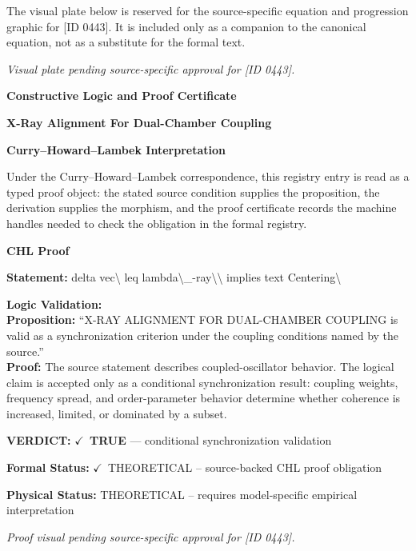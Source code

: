 \begingroup\footnotesize\sloppy
The visual plate below is reserved for the source-specific equation and progression graphic for [ID 0443]. It is included only as a companion to the canonical equation, not as a substitute for the formal text.
\par\endgroup
\begingroup\footnotesize\itshape
Visual plate pending source-specific approval for [ID 0443].
\par\endgroup

\clearpage
\begingroup\tzpsupportsetup
\noindent\textbf{\fontsize{10.8pt}{12.8pt}\selectfont [ID 0443] Constructive Logic and Proof Certificate}\par
\noindent\textbf{\fontsize{10pt}{12pt}\selectfont X-Ray Alignment For Dual-Chamber Coupling}\par
\vspace{0.45em}
\begingroup
\footnotesize
\setlength{\parskip}{0.22em}
\setlength{\parindent}{0pt}
\noindent\textbf{Curry--Howard--Lambek Interpretation}\par
Under the Curry--Howard--Lambek correspondence, this registry entry is read as a typed proof
object: the stated source condition supplies the proposition, the derivation supplies the
morphism, and the proof certificate records the machine handles needed to check the obligation
in the formal registry.

\vspace{0.45em}
\noindent\textbf{CHL Proof}\par
\textbf{Statement:} delta vec\textbackslash{} leq lambda\textbackslash{}\_-ray\textbackslash{}\textbackslash{} implies text Centering\textbackslash{}

\textbf{Logic Validation:}\\
\textbf{Proposition:} ``X-RAY ALIGNMENT FOR DUAL-CHAMBER COUPLING is valid as a synchronization criterion under
the coupling conditions named by the source.''\\
\textbf{Proof:} The source statement describes coupled-oscillator behavior. The logical claim is
accepted only as a conditional synchronization result: coupling weights, frequency
spread, and order-parameter behavior determine whether coherence is increased, limited,
or dominated by a subset.

\textbf{VERDICT:} \ensuremath{\checkmark}\ \textbf{TRUE} --- conditional synchronization validation

\textbf{Formal Status:} \ensuremath{\checkmark}\ THEORETICAL -- source-backed CHL proof obligation

\textbf{Physical Status:} THEORETICAL -- requires model-specific empirical interpretation
\par\vspace{0.45em}
\par
\vfill
\begingroup\footnotesize\itshape
Proof visual pending source-specific approval for [ID 0443].
\par\endgroup
\vfill
\endgroup
\endgroup

